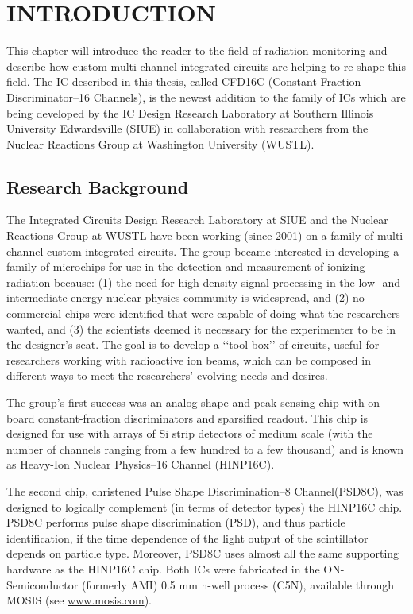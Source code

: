 \documentclass[12pt,oneside,final]{siuethesis}
\theoremstyle{definition}
\begin{document}

\chapter{INTRODUCTION}  %

This chapter will introduce the reader to the field of radiation monitoring and describe how custom multi-channel integrated circuits are helping to re-shape this field.  The IC described in this thesis, called CFD16C (Constant Fraction Discriminator--16 Channels), is the newest addition to the family of ICs which are being developed by the IC Design Research Laboratory at Southern Illinois University Edwardsville (SIUE) in collaboration with researchers from the Nuclear Reactions Group at Washington University (WUSTL).

\section{Research Background}

The Integrated Circuits Design Research Laboratory at SIUE and the Nuclear Reactions Group at WUSTL have been working (since 2001) on a family of multi-channel custom integrated circuits.  The group became interested in developing a family of microchips for use in the detection and measurement of ionizing radiation because: (1) the need for high-density signal processing in the low- and intermediate-energy nuclear physics community is widespread, and (2) no commercial chips were identified that were capable of doing what the researchers wanted, and (3) the scientists deemed it necessary for the experimenter to be in the designer's seat. The goal is to develop a ‘‘tool box’’ of circuits,
useful for researchers working with radioactive ion beams, which can be composed in different ways to meet the researchers' evolving needs and desires.

 
The group's first success was an analog shape and peak sensing chip with on-board constant-fraction discriminators and
sparsified readout. This chip is designed for use with arrays of Si strip detectors of medium scale (with the number of channels ranging from a few hundred to a few thousand) and is known as Heavy-Ion Nuclear Physics--16 Channel (HINP16C). 

The second chip, christened Pulse Shape Discrimination--8 Channel(PSD8C), was designed to logically complement (in terms of detector types) the HINP16C chip. PSD8C performs pulse shape discrimination (PSD), and thus particle identification, if the time dependence of the light output of the scintillator depends on particle type. Moreover, PSD8C uses almost all the same supporting hardware as the HINP16C chip. Both ICs were fabricated in the ON-Semiconductor (formerly AMI) 0.5 mm n-well process (C5N), available through MOSIS (see \url{www.mosis.com}).
\end{document}
